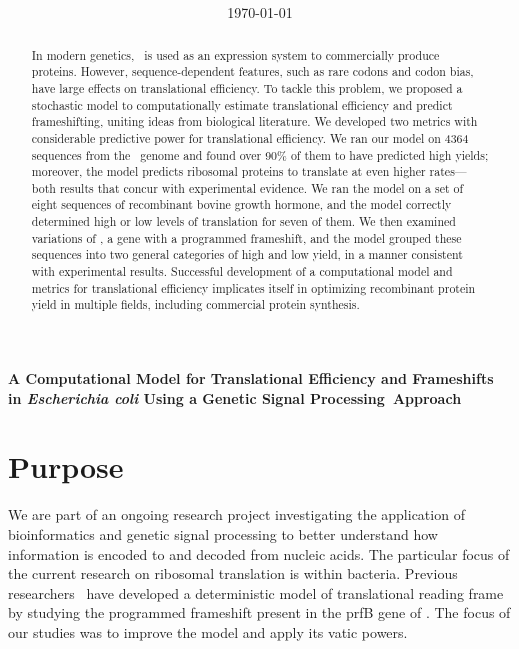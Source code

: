 \documentclass[12pt]{article}
\author{\sc{\BWFauthors}}
\date{{\sc \today}}
\title{\bf{\BWFtitle{\emph}}}
\newcommand{\BWFtitle}[2]{A Computational Model for Translational
  Efficiency and Frameshifts in #1{Escherichia coli} Using a Genetic Signal
  Processing#2Approach}
\begin{document}
\begin{singlespace}
  \tableofcontents
\end{singlespace}

\clearpage
\begin{Large}
\noindent\textbf{\BWFtitle{\emph}{~}}
\end{Large}
\begin{abstract}\begin{normalsize}
In modern genetics, \ecoli\ is used as an expression system to commercially 
produce proteins.  However, sequence-dependent features, such as rare codons 
and codon bias, have large effects on translational efficiency.  To tackle 
this problem, we proposed a stochastic model to computationally estimate 
translational efficiency and predict frameshifting, uniting ideas from biological 
literature. We developed two metrics with considerable predictive power 
for translational efficiency. We ran our model on 4364 sequences from the 
\ecoli\ genome and found over 90\% of them to have predicted high yields; 
moreover, the model predicts ribosomal proteins to translate at even higher rates---both 
results that concur with experimental evidence.  We ran the model on a set of eight 
sequences of recombinant bovine growth hormone, and the model correctly determined 
high or low levels of translation for seven of them.  We then examined variations of
\prfB, a gene with a programmed frameshift, and the model grouped these sequences 
into two general categories of high and low yield, in a manner consistent 
with experimental results.  Successful development of a computational model and 
metrics for translational efficiency implicates itself in optimizing 
recombinant protein yield in multiple fields, including commercial protein synthesis.
\end{normalsize}\end{abstract}  
  
\clearpage
{}

\section{Purpose}
We are part of an ongoing research project
investigating the application of bioinformatics
and genetic signal processing to better understand how
information is encoded to and decoded from nucleic acids.  The particular
focus of the current research on ribosomal translation is within
bacteria.  Previous researchers~\cite{lalit:mechanics}
have developed a deterministic model
of translational reading frame by studying the
programmed frameshift present in the prfB gene of \ecoli.  The focus
of our studies was to improve the model and apply its vatic powers.
\end{document}
